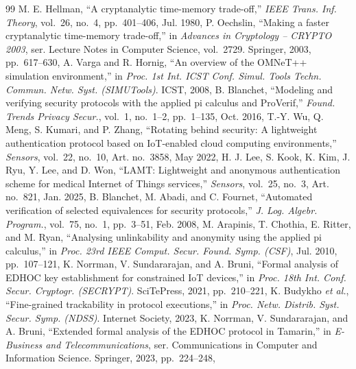 \begin{thebibliography}{99}
 M. E. Hellman, ``A cryptanalytic time-memory trade-off,'' \emph{IEEE Trans. Inf. Theory}, vol.~26, no.~4, pp.~401--406, Jul. 1980, 
 P. Oechslin, ``Making a faster cryptanalytic time-memory trade-off,'' in \emph{Advances in Cryptology -- CRYPTO 2003}, ser. Lecture Notes in Computer Science, vol.~2729. Springer, 2003, pp.~617--630, 
 A. Varga and R. Hornig, ``An overview of the OMNeT++ simulation environment,'' in \emph{Proc. 1st Int. ICST Conf. Simul. Tools Techn. Commun. Netw. Syst. (SIMUTools)}. ICST, 2008, 
\iffv
{} B. Blanchet, ``Modeling and verifying security protocols with the applied pi calculus and ProVerif,'' \emph{Found. Trends Privacy Secur.}, vol.~1, no.~1--2, pp.~1--135, Oct. 2016, 
 T.-Y. Wu, Q. Meng, S. Kumari, and P. Zhang, ``Rotating behind security: A lightweight authentication protocol based on IoT-enabled cloud computing environments,'' \emph{Sensors}, vol.~22, no.~10, Art. no.~3858, May 2022, 
 H. J. Lee, S. Kook, K. Kim, J. Ryu, Y. Lee, and D. Won, ``LAMT: Lightweight and anonymous authentication scheme for medical Internet of Things services,'' \emph{Sensors}, vol.~25, no.~3, Art. no.~821, Jan. 2025, 
 B. Blanchet, M. Abadi, and C. Fournet, ``Automated verification of selected equivalences for security protocols,'' \emph{J. Log. Algebr. Program.}, vol.~75, no.~1, pp.~3--51, Feb. 2008, 
 M. Arapinis, T. Chothia, E. Ritter, and M. Ryan, ``Analysing unlinkability and anonymity using the applied pi calculus,'' in \emph{Proc. 23rd IEEE Comput. Secur. Found. Symp. (CSF)}, Jul. 2010, pp.~107--121, 
 K. Norrman, V. Sundararajan, and A. Bruni, ``Formal analysis of EDHOC key establishment for constrained IoT devices,'' in \emph{Proc. 18th Int. Conf. Secur. Cryptogr. (SECRYPT)}. SciTePress, 2021, pp.~210--221, 
 K. Budykho \emph{et al.}, ``Fine-grained trackability in protocol executions,'' in \emph{Proc. Netw. Distrib. Syst. Secur. Symp. (NDSS)}. Internet Society, 2023, 
 K. Norrman, V. Sundararajan, and A. Bruni, ``Extended formal analysis of the EDHOC protocol in Tamarin,'' in \emph{E-Business and Telecommunications}, ser. Communications in Computer and Information Science. Springer, 2023, pp.~224--248, 
\fi
\end{thebibliography}
\fi
